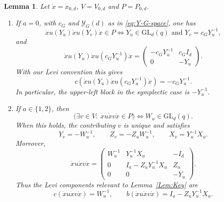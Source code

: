 \documentclass[12pt]{amsart}
\numberwithin{itemcounter}{subsection}
\theoremstyle{plain}
\newtheorem{lemma}[theorem]{Lemma}
\theoremstyle{definition}
\theoremstyle{remark}
\numberwithin{equation}{section}
\def\GL{\mathrm{GL}}
\begin{document}
\begin{lemma}\label{lem:xuxvx-all-cases}
Let $\dot{x}=\dot{x}_{0,d}$, $V=V_{0,d}$ and $P=P_{0,d}$.
\begin{enumerate}
\item If $a=0$, with $c_G$ and $\mathscr Y_G(d)$ as in
\eqref{eq:Y-G-space}, one has
\[
\dot{x}u(Y_u)\dot{x}u(Y_v)\dot{x}\in P
\iff
Y_u\in\GL_d(q)\text{ and }Y_v=c_GY_u^{-1},
\]
and
\begin{equation}\label{eq:bottom-product-a0}
\dot{x}u(Y_u)\dot{x}u(c_GY_u^{-1})\dot{x}
=
\begin{pmatrix}
-c_GY_u^{-1}&c_GI_d\\
0&-Y_u
\end{pmatrix}.
\end{equation}
With our Levi convention this gives
\begin{equation}\label{eq:bottom-Levi-a0}
c\!\left(\dot{x}u(Y_u)\dot{x}u(c_GY_u^{-1})\dot{x}\right)
=-c_GY_u^{-1}.
\end{equation}
In particular, the upper-left block in the symplectic case is
$-Y_u^{-1}$.

\item If $a\in\{1,2\}$, then
\[
\bigl(\exists v\in V:\ \dot{x}u\dot{x}v\dot{x}\in P\bigr)
\iff W_u\in\GL_d(q).
\]
When this holds, the contributing $v$ is unique and satisfies
\begin{equation}\label{eq:bottom-v-solution}
Y_v=-W_u^{-1},\qquad
Z_v=-Z_uW_u^{-1},\qquad
X_v=Y_u^{-1}X_u.
\end{equation}
Moreover,
\begin{equation}\label{eq:bottom-product-a12}
\dot{x}u\dot{x}v\dot{x}
=
\begin{pmatrix}
W_u^{-1}&Y_u^{-1}X_u&-I_d\\
0&I_a-Z_uY_u^{-1}X_u&Z_u\\
0&0&-Y_u
\end{pmatrix}.
\end{equation}
Thus the Levi components relevant to Lemma~\ref{Lem:Key} are
\begin{equation}\label{eq:bottom-Levi-a12}
c(\dot{x}u\dot{x}v\dot{x})=W_u^{-1},\qquad
b(\dot{x}u\dot{x}v\dot{x})=I_a-Z_uY_u^{-1}X_u.
\end{equation}
\end{enumerate}
\end{lemma}
\end{document}
